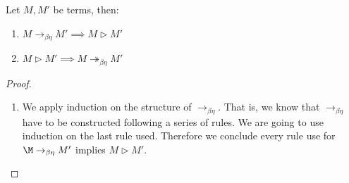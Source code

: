 \begin{lemma}\label{lemma:cr1}
  Let $M,M'$ be terms, then:
  \begin{enumerate}
  \item $M\to_{\beta\eta} M'\implies M \triangleright M'$
  \item $M\triangleright M'\implies M \twoheadrightarrow_{\beta\eta} M'$
  \end{enumerate}
\end{lemma}
\begin{proof}
  \begin{enumerate}
  \item  We  apply induction on the structure of $\to_{\beta\eta}$. That is, we know that $\to_{\beta\eta}$ have to be constructed following a series of rules. We are going to use induction on the last rule used. Therefore we conclude  every rule use for $\M \to_{\beta\eta} M'$ implies $M \triangleright M'$.


\end{enumerate}
\end{proof}
